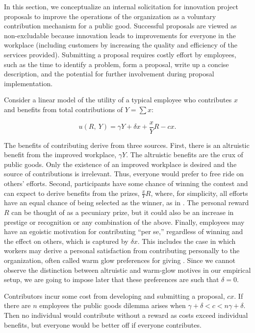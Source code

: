 \documentclass[12pt, titlepage]{article}
\begin{document}
In this section, we conceptualize an internal solicitation for
innovation project proposals to improve the operations of the
organization as a voluntary contribution mechanism for a public good.
Successful proposals are viewed as non-excludable because innovation
leads to improvements for everyone in the workplace (including customers
by increasing the quality and efficiency of the services provided).
Submitting a proposal requires costly effort by employees, such as the
time to identify a problem, form a proposal, write up a concise
description, and the potential for further involvement during proposal
implementation.

Consider a linear model of the utility of a typical employee who
contributes \(x\) and benefits from total contributions of \(Y=\sum x\):

\begin{equation} \label{eq:utility}
  u(R,~ Y) =  \gamma Y + \delta x + \frac{x}{Y} R - c x.
\end{equation}

The benefits of contributing derive from three sources. First, there is
an altruistic benefit from the improved workplace, \(\gamma Y\). The
altruistic benefits are the crux of public goods. Only the existence of
an improved workplace is desired and the source of contributions is
irrelevant. Thus, everyone would prefer to free ride on others' efforts.
Second, participants have some chance of winning the contest and can
expect to derive benefits from the prizes, \(\frac{x}{Y} R\), where, for
simplicity, all efforts have an equal chance of being selected as the
winner, as in \citet{morgan2000financing}. The personal reward \(R\) can
be thought of as a pecuniary prize, but it could also be an increase in
prestige or recognition or any combination of the above. Finally,
employees may have an egoistic motivation for contributing ``per se,''
regardless of winning and the effect on others, which is captured by
\(\delta x\). This includes the case in which workers may derive a
personal satisfaction from contributing personally to the organization,
often called warm glow preferences for giving \citep{andreoni1995warm}.
Since we cannot observe the distinction between altruistic and warm-glow
motives in our empirical setup, we are going to impose later that these
preferences are such that \(\delta=0\).

Contributors incur some cost from developing and submitting a proposal,
\(c x\). If there are \(n\) employees the public goods dilemma arises
when \(\gamma+\delta < c < n\gamma+\delta\). Then no individual would
contribute without a reward as costs exceed individual benefits, but
everyone would be better off if everyone contributes.
\end{document}

